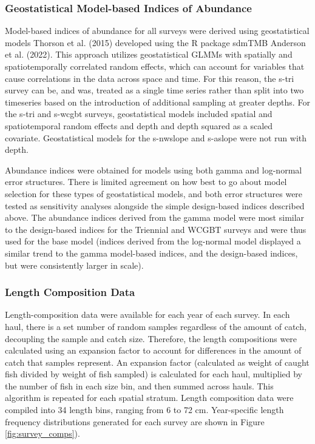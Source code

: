 \documentclass[11pt,
  english,
  letterpaper,
]{article}
\begin{document}
\hypertarget{geostatistical-model-based-indices-of-abundance}{%
\subsubsection{Geostatistical Model-based Indices of Abundance}\label{geostatistical-model-based-indices-of-abundance}}

Model-based indices of abundance for all surveys were derived using geostatistical models Thorson et al. (2015) developed using the R package sdmTMB Anderson et al. (2022). This approach utilizes geostatistical GLMMs with spatially and spatiotemporally correlated random effects, which can account for variables that cause correlations in the data across space and time. For this reason, the \gls{s-tri} survey can be, and was, treated as a single time series rather than split into two timeseries based on the introduction of additional sampling at greater depths. For the \gls{s-tri} and \gls{s-wcgbt} surveys, geostatistical models included spatial and spatiotemporal random effects and depth and depth squared as a scaled covariate. Geostatistical models for the \gls{s-nwslope} and \gls{s-aslope} were not run with depth.

Abundance indices were obtained for models using both gamma and log-normal error structures. There is limited agreement on how best to go about model selection for these types of geostatistical models, and both error structures were tested as sensitivity analyses alongside the simple design-based indices described above. The abundance indices derived from the gamma model were most similar to the design-based indices for the Triennial and WCGBT surveys and were thus used for the base model (indices derived from the log-normal model displayed a similar trend to the gamma model-based indices, and the design-based indices, but were consistently larger in scale).

\hypertarget{length-composition-data}{%
\subsubsection{Length Composition Data}\label{length-composition-data}}

Length-composition data were available for each year of each survey. In each haul, there is a set number of random samples regardless of the amount of catch, decoupling the sample and catch size. Therefore, the length compositions were calculated using an expansion factor to account for differences in the amount of catch that samples represent. An expansion factor (calculated as weight of caught fish divided by weight of fish sampled) is calculated for each haul, multiplied by the number of fish in each size bin, and then summed across hauls. This algorithm is repeated for each spatial stratum. Length composition data were compiled into 34 length bins, ranging from 6 to 72 cm. Year-specific length frequency distributions generated for each survey are shown in Figure \ref{fig:survey_comps}).
\end{document}
